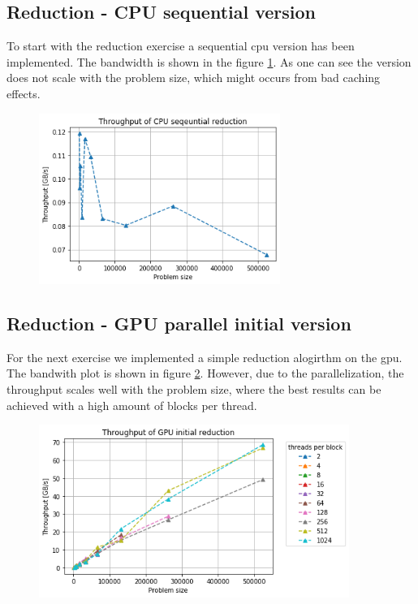 \documentclass[12pt]{article}
\begin{document}
\vspace{10pt}

\subsection{Reduction - CPU sequential version}
To start with the reduction exercise a sequential cpu version has been implemented. The bandwidth is shown in the figure \ref{fig:cpu}. As one can see the version does not scale with the problem size, which might occurs from bad caching effects.

\begin{figure}
	\centering
	\includegraphics[width=0.7\textwidth]{cpu_sequtential.png}
	\label{fig:cpu}
\end{figure}


\subsection{Reduction - GPU parallel initial version}
For the next exercise we implemented a simple reduction alogirthm on the gpu. The bandwith plot is shown in figure \ref{fig:gpu}. However, due to the parallelization, the throughput scales well with the problem size, where the best results can be achieved with a high amount of blocks per thread.


\begin{figure}
	\centering
	\includegraphics[width=0.9\textwidth]{gpu_initial.png}
	\label{fig:gpu}
\end{figure}
\end{document}
